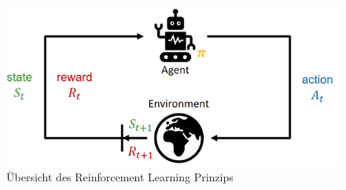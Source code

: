 \begin{figure} [h]
\begin{minipage}[t]{1\textwidth}
\vspace{0pt}
\includegraphics[width=\textwidth]{images/RL_Grundlagen}
 \caption{Übersicht des Reinforcement Learning Prinzips \cite{rl_pic}}
\label{RL_Grund}
\end{minipage}
\end{figure}


